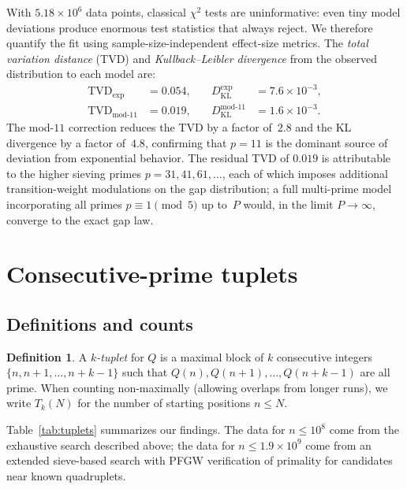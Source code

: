 \documentclass[11pt,a4paper]{article}
\theoremstyle{plain}
\theoremstyle{definition}
\newtheorem{definition}[theorem]{Definition}
\theoremstyle{remark}
\begin{document}
With $5.18 \times 10^6$ data points, classical $\chi^2$ tests are uninformative: even tiny model deviations produce enormous test statistics that always reject.  We therefore quantify the fit using sample-size-independent effect-size metrics.  The \emph{total variation distance} (TVD) and \emph{Kullback--Leibler divergence} from the observed distribution to each model are:
\begin{equation}\label{eq:effectsize}
\begin{aligned}
\mathrm{TVD}_{\mathrm{exp}} &= 0.054, &\quad D_{\mathrm{KL}}^{\mathrm{exp}} &= 7.6 \times 10^{-3}, \\
\mathrm{TVD}_{\mathrm{mod\text{-}11}} &= 0.019, &\quad D_{\mathrm{KL}}^{\mathrm{mod\text{-}11}} &= 1.6 \times 10^{-3}.
\end{aligned}
\end{equation}
The mod-$11$ correction reduces the TVD by a factor of~$2.8$ and the KL divergence by a factor of~$4.8$, confirming that $p = 11$ is the dominant source of deviation from exponential behavior.  The residual TVD of $0.019$ is attributable to the higher sieving primes $p = 31, 41, 61, \ldots$, each of which imposes additional transition-weight modulations on the gap distribution; a full multi-prime model incorporating all primes $p \equiv 1 \pmod{5}$ up to~$P$ would, in the limit $P \to \infty$, converge to the exact gap law.


\section{Consecutive-prime tuplets}
\label{sec:tuplets}

\subsection{Definitions and counts}

\begin{definition}
A \emph{$k$-tuplet} for $Q$ is a maximal block of $k$ consecutive integers $\{n, n{+}1, \ldots, n{+}k{-}1\}$ such that $Q(n), Q(n{+}1), \ldots, Q(n{+}k{-}1)$ are all prime. When counting non-maximally (allowing overlaps from longer runs), we write $T_k(N)$ for the number of starting positions $n \le N$.
\end{definition}

Table~\ref{tab:tuplets} summarizes our findings. The data for $n \le 10^8$ come from the exhaustive search described above; the data for $n \le 1.9 \times 10^9$ come from an extended sieve-based search with PFGW verification of primality for candidates near known quadruplets.
\end{document}
